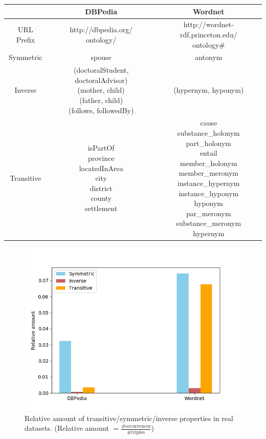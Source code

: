 \begin{center}
	\begin{tabular}{|c|c|c|}
		\hline 
		& DBPedia & Wordnet \\ 
		\hline 
		URL Prefix & \makecell{http://dbpedia.org/\\ontology/} & \makecell{http://wordnet-rdf.princeton.edu/\\ontology\#} \\
		\hline
		Symmetric & spouse & antonym \\ 
		\hline 
		Inverse & \makecell{(doctoralStudent, doctoralAdvisor)\\(mother, child)\\(father, child) \\(follows, followedBy)} & (hypernym, hyponym) \\ 
		\hline 
		Transitive & \makecell{isPartOf\\province\\locatedInArea\\city\\district\\county\\settlement} & \makecell{cause\\substance\_holonym\\part\_holonym\\entail\\member\_holonym\\member\_meronym\\instance\_hypernym\\instance\_hyponym\\hyponym\\par\_meronym\\substance\_meronym\\hypernym} \\ 
		\hline 
	\end{tabular} 
	\label{tab:ontologyKnowledgeRelevantProperties}
\end{center}

\begin{figure}
	\centering
	\includegraphics[width=0.7\linewidth]{figures/4_evaluation/ontOccurrences}
	\caption{Relative amount of transitive/symmetric/inverse properties in real datasets. (Relative amount $=\frac{\text{\#occurrences}}{\text{\#triples}}$)}
	\label{fig:ontoccurrences}
\end{figure}

